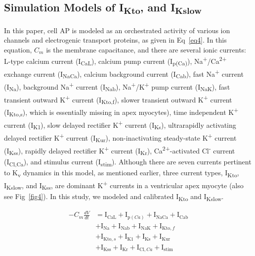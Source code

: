 \documentclass[10pt,letterpaper]{article}
\begin{document}
\subsection*{Simulation Models of I\textsubscript{Kto}, and I\textsubscript{Kslow}}
In this paper, cell AP is modeled as an orchestrated activity of various ion channels and electrogenic transport proteins, as given in Eq~\ref{eq4}. In this equation, $C_m$ is the membrane capacitance, and there are several ionic currents: L-type calcium current (I\textsubscript{CaL}), calcium pump current (I\textsubscript{p(Ca)}), Na\textsuperscript{+}/Ca\textsuperscript{2+} exchange current (I\textsubscript{NaCa}), calcium background current (I\textsubscript{Cab}), fast Na\textsuperscript{+} current (I\textsubscript{Na}), background Na\textsuperscript{+} current (I\textsubscript{Nab}), Na\textsuperscript{+}/K\textsuperscript{+} pump current (I\textsubscript{NaK}), fast transient outward K\textsuperscript{+} current (I\textsubscript{Kto,f}), slower transient outward K\textsuperscript{+} current (I\textsubscript{Kto,s}), which is essentially missing in apex myocytes), time independent K\textsuperscript{+} current (I\textsubscript{K1}), slow delayed rectifier K\textsuperscript{+} current (I\textsubscript{Ks}), ultrarapidly activating delayed rectifier K\textsuperscript{+} current (I\textsubscript{Kur}), non-inactivating steady-state K\textsuperscript{+} current (I\textsubscript{Kss}), rapidly delayed rectifier K\textsuperscript{+} current (I\textsubscript{Kr}), Ca\textsuperscript{2+}-activated Cl\textsuperscript{-} current (I\textsubscript{Cl,Ca}), and stimulus current (I\textsubscript{stim}). Although there are seven currents pertinent to K\textsubscript{v} dynamics in this model, as mentioned earlier, three current types, I\textsubscript{Kto}, I\textsubscript{Kslow}, and I\textsubscript{Kss}, are dominant K\textsuperscript{+} currents in a ventricular apex myocyte \cite{nerbonne2005molecular} (also see Fig~\ref{fig4}). In this study, we modeled and calibrated I\textsubscript{Kto} and I\textsubscript{Kslow}.

\begin{equation}
    \begin{split}
    -C_{m}\frac{dV}{dt} &= \mathrm{I}_{\mathrm{CaL}}+\mathrm{I}_{\mathrm{p}(Ca)}+\mathrm{I}_{\mathrm{NaCa}}+\mathrm{I}_{\mathrm{Cab}}\\
    &+\mathrm{I}_{\mathrm{Na}}+\mathrm{I}_{\mathrm{Nab}}+\mathrm{I}_{\mathrm{NaK}}+\mathrm{I}_{\mathrm{Kto},f}\\
    &+\mathrm{I}_{\mathrm{Kto},s}+\mathrm{I}_{\mathrm{K1}}+\mathrm{I}_{\mathrm{Ks}}+\mathrm{I}_{\mathrm{Kur}}\\
    &+\mathrm{I}_{\mathrm{Kss}}+\mathrm{I}_{\mathrm{Kr}}+\mathrm{I}_{\mathrm{Cl},Ca}+\mathrm{I}_{\mathrm{stim}}
    \end{split}
    \label{eq4}
\end{equation}
\end{document}
